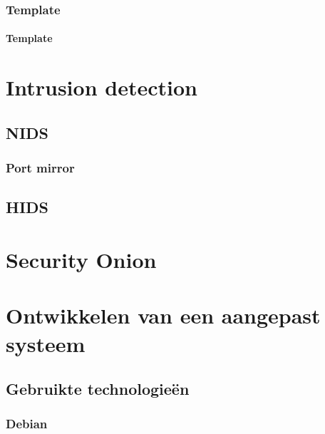 \documentclass[a4paper, 12pt]{report}
\begin{document}
\subsection{Template}
\subsubsection{Template}
\blindtext
\autocite{example}

\chapter{Intrusion detection}
\section{NIDS}
\subsection{Port mirror}
\section{HIDS}

\chapter{Security Onion}

\chapter{Ontwikkelen van een aangepast systeem}
\section{Gebruikte technologie\"en}
\subsection{Debian}
\end{document}
